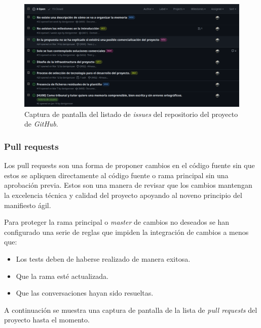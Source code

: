 \begin{figure}[H]
    \caption{Captura de pantalla del listado de \textit{issues} del repositorio del proyecto de \textit{GitHub}.}
    \centering
    \vspace*{0.5cm}
    \includegraphics[scale=0.2]{figuras/github_issues.png}
\end{figure}

\subsubsection{Pull requests}

Los pull requests son una forma de proponer cambios en el código fuente sin que estos se apliquen directamente al código fuente o rama principal sin una aprobación previa. Estos son una manera de revisar que los cambios mantengan la excelencia técnica y calidad del proyecto apoyando al noveno principio del manifiesto ágil.

Para proteger la rama principal o \textit{master} de cambios no deseados se han configurado una serie de reglas que impiden la integración de cambios a menos que:

\begin{itemize}
    \item Los tests deben de haberse realizado de manera exitosa.
    \item Que la rama esté actualizada.
    \item Que las conversaciones hayan sido resueltas.
\end{itemize}

A continuación se muestra una captura de pantalla de la lista de \textit{pull requests} del proyecto hasta el momento.

